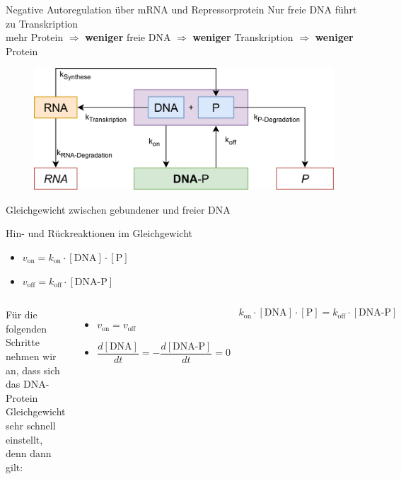 \documentclass[11pt,aspectratio=169,reqno]{beamer}
\begin{document}
\begin{frame}{Negative Autoregulation über mRNA und Repressorprotein}
    \centering Nur freie DNA führt zu Transkription\\[1em]
    mehr Protein $\Rightarrow$ \textbf{weniger} freie DNA $\Rightarrow$ \textbf{weniger} Transkription $\Rightarrow$ \textbf{weniger} Protein

    \vspace{2em}

    \begin{figure}
        \centering
        \includegraphics[width=.6\textwidth]{images/negative_autoregulation_overview.png}
    \end{figure}
\end{frame}

\begin{frame}{Gleichgewicht zwischen gebundener und freier DNA}

    Hin- und Rückreaktionen im Gleichgewicht
    \begin{itemize}
        \item $v_\text{on}=k_\text{on}\cdot [\text{DNA}]\cdot [\text{P}]$
        \item $v_\text{off}=k_\text{off}\cdot [\text{DNA-P}]$\pause
    \end{itemize}

    \vspace{1.5em}

    \begin{columns}[onlytextwidth]
    Für die folgenden Schritte nehmen wir an, dass sich das DNA-Protein Gleichgewicht sehr schnell einstellt, denn dann gilt:
    \begin{itemize}
        \item $v_\text{on}=v_\text{off}$\\[8pt]
        \item $\dfrac{d[\text{DNA}]}{dt}=-\dfrac{d[\text{DNA-P}]}{dt}=0$\\[8pt]
    \end{itemize}
    \[k_\text{on}\cdot [\text{DNA}]\cdot [\text{P}]=k_\text{off}\cdot [\text{DNA-P}]\]
    \end{columns}
\end{frame}
\end{document}
